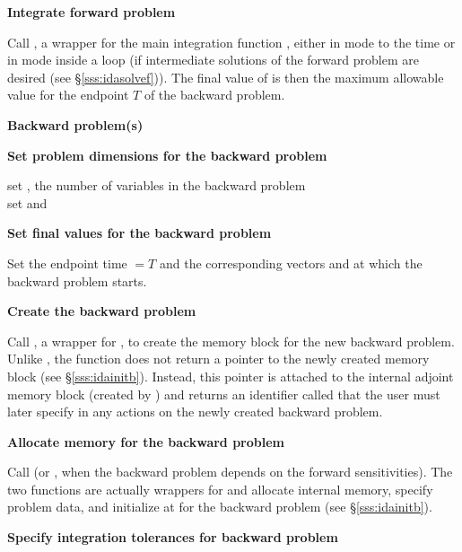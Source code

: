 \begin{Steps}
\item
  {\bf Integrate forward problem}

  Call , a wrapper for the {\idas} main integration
  function , either in  mode to the time 
   or in  mode inside a loop (if intermediate
  solutions of the forward problem are desired (see \S\ref{sss:idasolvef})).
  The final value of  is then the maximum allowable value for
  the endpoint $T$ of the backward problem.

  \vspace{0.2in}\centerline{\bf Backward problem(s)}

 \item \label{i:back_start}
   {\bf Set problem dimensions for the backward problem}
   
   {\s} set , the number of variables in the backward problem \\
   {\p} set  and 

\item
  {\bf Set final values for the backward problem}

  Set the endpoint time  $= T$ and the corresponding vectors 
  and  at which the backward problem starts.

\item
  {\bf Create the backward problem}

  Call , a wrapper for , to create the
  {\idas} memory block for the new backward problem. Unlike , 
  the function  does not return a pointer to the newly created 
  memory block (see \S\ref{sss:idainitb}). Instead, this pointer is attached to 
  the internal adjoint memory  block (created by ) and returns an
  identifier called  that the user must later specify in any actions on
  the newly created backward problem.

\item
  {\bf Allocate memory for the backward problem}

  Call  (or , when the backward problem depends on the
  forward sensitivities). The two functions are actually wrappers for  
  and allocate internal memory, specify problem data, and initialize {\idas} 
  at  for the backward problem (see \S\ref{sss:idainitb}).

\item 
  {\bf Specify integration tolerances for backward problem}
  

\end{Steps}
